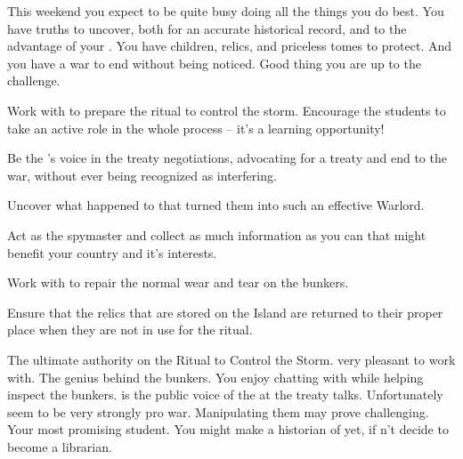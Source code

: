 \documentclass[char]{GL2020}
\begin{document}
This weekend you expect to be quite busy doing all the things you do best. You have truths to uncover, both for an accurate historical record, and to the advantage of your \cQueen{\Majesty}. You have children, relics, and priceless tomes to protect. And you have a war to end without being noticed. Good thing you are up to the challenge.

\begin{itemz}[Goals]
	\item Work with \cLibrarian{} to prepare the ritual to control the storm. Encourage the students to take an active role in the whole process -- it’s a learning opportunity!
	\item Be the \cQueen{\Majesty}’s voice in the treaty negotiations, advocating for a treaty and end to the war, without ever being recognized as interfering.
	\item Uncover what happened to \cLoud{} that turned them into such an effective Warlord.
	\item Act as the \pFarm{} spymaster and collect as much information as you can that might benefit your country and it’s interests.
	\item Work with \cBunker{} to repair the normal wear and tear on the bunkers.
	\item Ensure that the relics that are stored on the Island are returned to their proper place when they are not in use for the ritual.
\end{itemz}

\begin{itemz}[Notes]
	\item 
\end{itemz}

\begin{contacts}
	\contact{\cLibrarian{}} The ultimate authority on the Ritual to Control the Storm. \cLibrarian{\They} \cLibrarian{\are} very pleasant to work with.
	\contact{\cBunker{}} The genius behind the bunkers. You enjoy chatting with \cBunker{\them} while helping inspect the bunkers.
	\contact{\cEvil{}} \cEvil{} is the public voice of the \cQueen{\Majesty} at the treaty talks. Unfortunately \cEvil{\They} seem to be very strongly pro war. Manipulating them may prove challenging.
	\contact{\cLibAssist{}} Your most promising student. You might make a historian of \cLibAssist{\them} yet, if \cLibAssist{\they} \cLibAssist{\does}n’t decide to become a librarian.
\end{contacts}
\end{document}
